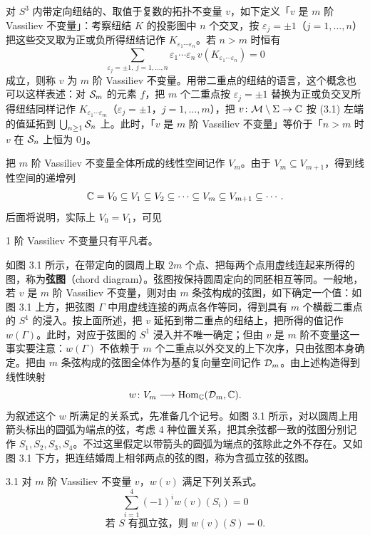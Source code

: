 对 $S^{3}$ 内带定向纽结的、取值于复数的拓扑不变量 $v$，如下定义「$v$ 是 $m$ 阶 Vassiliev 不变量」：考察纽结 $K$ 的投影图中 $n$ 个交叉，按 $\varepsilon_j=\pm1$（$j=1,\dots,n$）把这些交叉取为正或负所得纽结记作 $K_{\varepsilon_1\cdots\varepsilon_n}$。若 $n>m$ 时恒有
\begin{equation}
  \sum_{\varepsilon_j=\pm1,\ j=1,\dots,n}
  \varepsilon_1\cdots\varepsilon_n\, v(K_{\varepsilon_1\cdots\varepsilon_n})=0 \tag{3.1}
\end{equation}
成立，则称 $v$ 为 $m$ 阶 Vassiliev 不变量。用带二重点的纽结的语言，这个概念也可以这样表述：对 $\mathcal{S}_m$ 的元素 $f$，把 $m$ 个二重点按 $\varepsilon_j=\pm 1$ 替换为正或负交叉所得纽结同样记作 $K_{\varepsilon_1\cdots\varepsilon_m}$（$\varepsilon_j=\pm1$，$j=1,\dots,m$），把 $v\colon\mathcal{M}\setminus\Sigma\to\mathbb{C}$ 按 (3.1) 左端的值延拓到 $\bigcup_{n\ge1}\mathcal{S}_n$ 上。此时，「$v$ 是 $m$ 阶 Vassiliev 不变量」等价于「$n>m$ 时 $v$ 在 $\mathcal{S}_n$ 上恒为 $0$」。

把 $m$ 阶 Vassiliev 不变量全体所成的线性空间记作 $V_m$。由于 $V_m\subseteq V_{m+1}$，得到线性空间的递增列
\[
  \mathbb{C}=V_{0}\subseteq V_{1}\subseteq V_{2}\subseteq\cdots\subseteq V_{m}\subseteq V_{m+1}\subseteq\cdots .
\]
后面将说明，实际上 $V_{0}=V_{1}$，可见

1 阶 Vassiliev 不变量只有平凡者。

如图 3.1 所示，在带定向的圆周上取 $2m$ 个点、把每两个点用虚线连起来所得的图，称为\textbf{弦图}（chord diagram）。弦图按保持圆周定向的同胚相互等同。一般地，若 $v$ 是 $m$ 阶 Vassiliev 不变量，则对由 $m$ 条弦构成的弦图，如下确定一个值：如图 3.1 上方，把弦图 $\Gamma$ 中用虚线连接的两点各作等同，得到具有 $m$ 个横截二重点的 $S^{1}$ 的浸入。按上面所述，把 $v$ 延拓到带二重点的纽结上，把所得的值记作 $w(\Gamma)$。此时，对应于弦图的 $S^{1}$ 浸入并不唯一确定；但由 $v$ 是 $m$ 阶不变量这一事实要注意：$w(\Gamma)$ 不依赖于 $m$ 个二重点以外交叉的上下次序，只由弦图本身确定。把由 $m$ 条弦构成的弦图全体作为基的复向量空间记作 $\mathcal{D}_m$。由上述构造得到线性映射
\[
  w\colon V_m\longrightarrow \operatorname{Hom}_{\mathbb{C}}(\mathcal{D}_m,\mathbb{C}).
\]
为叙述这个 $w$ 所满足的关系式，先准备几个记号。如图 3.1 所示，对以圆周上用箭头标出的圆弧为端点的弦，考虑 4 种位置关系，把其余弦都一致的弦图分别记作 $S_1,S_2,S_3,S_4$。不过这里假定以带箭头的圆弧为端点的弦除此之外不存在。又如图 3.1 下方，把连结婚周上相邻两点的弦的图，称为含孤立弦的弦图。

\begin{proposition*}{3.1}
  对 $m$ 阶 Vassiliev 不变量 $v$，$w(v)$ 满足下列关系式。
  \begin{equation}
    \sum_{i=1}^{4}(-1)^{i}w(v)(S_i)=0 \tag{3.2}
  \end{equation}
  \begin{equation}
    \text{若 } S \text{ 有孤立弦，则 } w(v)(S)=0 . \tag{3.3}
  \end{equation}
\end{proposition*}

